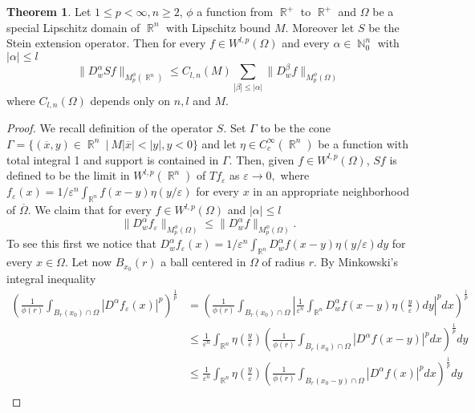 \documentclass[12pt]{article}
\theoremstyle{definition}
\newtheorem{theorem}{Theorem}
\DeclareMathOperator\rr{\mathbb{R}}
\DeclareMathOperator\nn{\mathbb{N}}
\begin{document}
\begin{theorem}\label{speciallip}
Let $1\le p<\infty,n\ge2$, $\phi$ a function from $\rr^+$ to $\rr^+$ and $\Omega$ be a special Lipschitz domain of $\rr^n$ with Lipschitz bound $M.$ Moreover let $S$ be the Stein extension operator. Then for every $f \in W^{l,p}(\Omega)$ and every $\alpha \in \nn_0^n$ with $|\alpha|\le l$ 
\begin{equation}
 \| D^\alpha_w Sf\|_{M_p^\phi(\rr^n)}\le C_{l,n}(M)\sum_{|\beta|\le |\alpha|}\|D^\beta_w f \|_{M_p^\phi(\Omega)} \label{Sbound}
 \end{equation}
 where $C_{l,n}(\Omega)$ depends only on $n,l$ and $M.$

 \begin{proof}
We recall definition of the operator $S.$ Set  $\Gamma$ to be the cone $\Gamma=\{(\overline x, y) \in \rr^n \ | \ M |\overline x|<|y|, y<0 \}$ and let $\eta \in C^\infty_c(\rr^n)$ be a function with total integral 1 and support is contained in $\Gamma.$ Then, given $f \in W^{l,p}(\Omega)$, $Sf$ is defined to be the limit in $W^{l,p}(\rr^n)$ of $Tf_\varepsilon$ as $\varepsilon \to 0,$ where $f_\varepsilon(x)=1/\varepsilon^n \int_{\rr^n} f(x-y)\eta(y/\varepsilon)$ for every $x$ in an appropriate neighborhood of $	\overline \Omega$. We claim that for every $f \in W^{l,p}(\Omega)$ and $|\alpha|\le l$
\begin{equation}
\| D^\alpha_w f_\varepsilon\|_{M^\phi_p(\Omega)} \le \| D^\alpha_w f\|_{M^\phi_p(\Omega)} \label{epsbound}.
\end{equation}
To see this first we notice that $D^\alpha_w f_\varepsilon(x)=1/\varepsilon^n \int_{\rr^n} D^\alpha_w f(x-y)\eta(y/\varepsilon)dy$ for every $x \in \Omega.$ Let now $B_{x_0}(r)$ a ball centered in $\Omega$ of radius $r$. By Minkowski's integral inequality
\begin{align*}
 \left( \frac{1}{	\phi(r)} \int_{B_r(x_0)\cap \Omega} |D^\alpha f_\varepsilon (x)|^p \right)^{\frac{1}{p}} &= \left( \frac{1}{	\phi(r)} \int_{B_r(x_0)\cap \Omega} \left |\frac{1}{\varepsilon^n} \int_{\rr^n} D^\alpha_w f(x-y)\eta\left(\frac{y}{\varepsilon} \right)dy\right|^pdx \right)^{\frac{1}{p}} \\
 &\le \frac{1}{\varepsilon^n}  \int_{\rr^n} \eta\left(\frac{y}{\varepsilon} \right) \left (\frac{1}{	\phi(r)}  \int_{B_r(x_0)\cap \Omega} |D^\alpha f(x-y)|^p dx\right)^{\frac{1}{p}}dy \\
 &\le\frac{1}{\varepsilon^n}  \int_{\rr^n} \eta\left(\frac{y}{\varepsilon} \right)  \left (\frac{1}{	\phi(r)}  \int_{B_r(x_0-y)\cap \Omega} |D^\alpha f(x)|^p dx\right)^{\frac{1}{p}}dy \\

\end{align*}
\end{proof}
\end{theorem}
\end{document}
